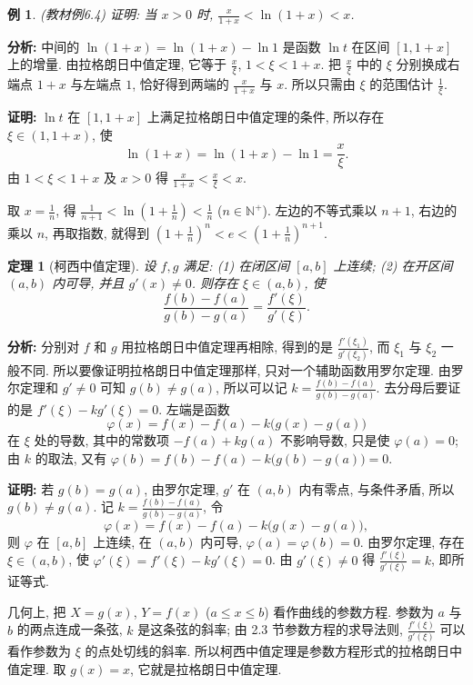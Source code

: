 \documentclass[UTF8,openany]{ctexbook}
\theoremstyle{chinesetextbook}
\newtheorem{example}{例}[section]
\newtheorem{theorem}{定理}[section]
\newenvironment{cnproof}{\par\indent\textbf{证明:} \ignorespaces}{\par}
\begin{document}
\begin{example}\label{ex:c2-6-4}
\textnormal{(教材例6.4)} 证明: 当 $x>0$ 时, $\displaystyle\frac x{1+x}<\ln(1+x)<x$.
\end{example}
\par\indent\textbf{分析:} 中间的 $\ln(1+x)=\ln(1+x)-\ln1$ 是函数 $\ln t$ 在区间 $[1,1+x]$ 上的增量. 由拉格朗日中值定理, 它等于 $\displaystyle\frac x\xi$, $1<\xi<1+x$. 把 $\displaystyle\frac x\xi$ 中的 $\xi$ 分别换成右端点 $1+x$ 与左端点 $1$, 恰好得到两端的 $\displaystyle\frac x{1+x}$ 与 $x$. 所以只需由 $\xi$ 的范围估计 $\displaystyle\frac1\xi$.
\begin{cnproof}
$\ln t$ 在 $[1,1+x]$ 上满足拉格朗日中值定理的条件, 所以存在 $\xi\in(1,1+x)$, 使
\[
\ln(1+x)=\ln(1+x)-\ln1=\frac x\xi.
\]
由 $1<\xi<1+x$ 及 $x>0$ 得 $\displaystyle\frac x{1+x}<\frac x\xi<x$.
\end{cnproof}
取 $\displaystyle x=\frac1n$, 得 $\displaystyle\frac1{n+1}<\ln\left(1+\frac1n\right)<\frac1n$ ($n\in\mathbb N^+$). 左边的不等式乘以 $n+1$, 右边的乘以 $n$, 再取指数, 就得到 $\displaystyle\left(1+\frac1n\right)^n<e<\left(1+\frac1n\right)^{n+1}$.
\begin{theorem}[柯西中值定理]\label{thm:c2-6-cauchy}
设 $f,g$ 满足: (1) 在闭区间 $[a,b]$ 上连续; (2) 在开区间 $(a,b)$ 内可导, 并且 $g'(x)\ne0$. 则存在 $\xi\in(a,b)$, 使
\[
\frac{f(b)-f(a)}{g(b)-g(a)}=\frac{f'(\xi)}{g'(\xi)}.
\]
\end{theorem}
\par\indent\textbf{分析:} 分别对 $f$ 和 $g$ 用拉格朗日中值定理再相除, 得到的是 $\displaystyle\frac{f'(\xi_1)}{g'(\xi_2)}$, 而 $\xi_1$ 与 $\xi_2$ 一般不同. 所以要像证明拉格朗日中值定理那样, 只对一个辅助函数用罗尔定理. 由罗尔定理和 $g'\ne0$ 可知 $g(b)\ne g(a)$, 所以可以记 $\displaystyle k=\frac{f(b)-f(a)}{g(b)-g(a)}$. 去分母后要证的是 $f'(\xi)-kg'(\xi)=0$. 左端是函数
\[
\varphi(x)=f(x)-f(a)-k\bigl(g(x)-g(a)\bigr)
\]
在 $\xi$ 处的导数, 其中的常数项 $-f(a)+kg(a)$ 不影响导数, 只是使 $\varphi(a)=0$; 由 $k$ 的取法, 又有 $\varphi(b)=f(b)-f(a)-k\bigl(g(b)-g(a)\bigr)=0$.
\begin{cnproof}
若 $g(b)=g(a)$, 由罗尔定理, $g'$ 在 $(a,b)$ 内有零点, 与条件矛盾, 所以 $g(b)\ne g(a)$. 记 $\displaystyle k=\frac{f(b)-f(a)}{g(b)-g(a)}$, 令
\[
\varphi(x)=f(x)-f(a)-k\bigl(g(x)-g(a)\bigr),
\]
则 $\varphi$ 在 $[a,b]$ 上连续, 在 $(a,b)$ 内可导, $\varphi(a)=\varphi(b)=0$. 由罗尔定理, 存在 $\xi\in(a,b)$, 使 $\varphi'(\xi)=f'(\xi)-kg'(\xi)=0$. 由 $g'(\xi)\ne0$ 得 $\displaystyle\frac{f'(\xi)}{g'(\xi)}=k$, 即所证等式.
\end{cnproof}
几何上, 把 $X=g(x)$, $Y=f(x)$ ($a\le x\le b$) 看作曲线的参数方程. 参数为 $a$ 与 $b$ 的两点连成一条弦, $k$ 是这条弦的斜率; 由 2.3 节参数方程的求导法则, $\displaystyle\frac{f'(\xi)}{g'(\xi)}$ 可以看作参数为 $\xi$ 的点处切线的斜率. 所以柯西中值定理是参数方程形式的拉格朗日中值定理. 取 $g(x)=x$, 它就是拉格朗日中值定理.
\end{document}
